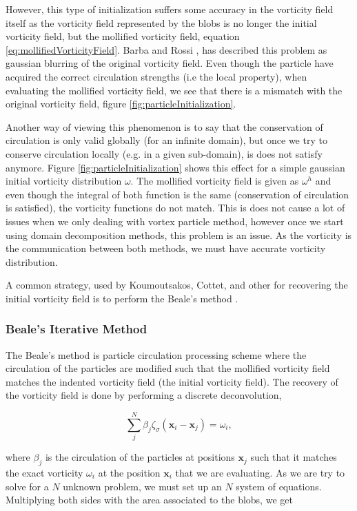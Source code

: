 However, this type of initialization suffers some accuracy in the vorticity field itself as the vorticity field represented by the blobs is no longer the initial vorticity field, but the mollified vorticity field, equation \ref{eq:mollifiedVorticityField}. Barba and Rossi \cite{Barba2010}, has described this problem as gaussian blurring of the original vorticity field. Even though the particle have acquired the correct circulation strengths (i.e the local property), when evaluating the mollified vorticity field, we see that there is a mismatch with the original vorticity field, figure \ref{fig:particleInitialization}. 

Another way of viewing this phenomenon is to say that the conservation of circulation is only valid globally (for an infinite domain), but once we try to conserve circulation locally (e.g. in a given sub-domain), is does not satisfy anymore. Figure \ref{fig:particleInitialization} shows this effect for a simple gaussian initial vorticity distribution $\omega$. The mollified vorticity field is given as $\omega^h$ and even though the integral of both function is the same (conservation of circulation is satisfied), the vorticity functions do not match. This is does not cause a lot of issues when we only dealing with vortex particle method, however once we start using domain decomposition methods, this problem is an issue. As the vorticity is the communication between both methods, we must have accurate vorticity distribution.

A common strategy, used by Koumoutsakos, Cottet, and other for recovering the initial vorticity field is to perform the Beale's method \cite{Beale1988} \cite{Cottet2000a}.


\subsubsection*{Beale's Iterative Method}

The Beale's method is particle circulation processing scheme where the circulation of the particles are modified such that the mollified vorticity field matches the indented vorticity field (the initial vorticity field). The recovery of the vorticity field is done by performing a discrete deconvolution,

	\begin{equation}
	\sum_j^N \beta_j \zeta_{\sigma}\left(\mathbf{x}_i-\mathbf{x}_j\right) = \omega_i,
		\end{equation}

where $\beta_j$ is the circulation of the particles at positions $\mathbf{x}_j$ such that it matches the exact vorticity $\omega_i$ at the position $\mathbf{x}_i$ that we are evaluating.  As we are try to solve for a $N$ unknown problem, we must set up an $N$ system of equations. Multiplying both sides with the area associated to the blobs, we get

